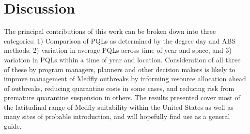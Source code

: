 \documentclass[10pt,a4paper,twocolumn]{article}
\begin{document}




\section*{Discussion}

The principal contributions of this work can be broken down into three categories: 
1) Comparison of PQLs as determined by the degree day and ABS methods. 
2) variation in average PQLs across time of year and space, and
3) variation in PQLs within a time of year and location.
Consideration of all three of these by program managers, planners and other decision makers 
is likely to
improve management of Medfly outbreaks %
by informing resource allocation ahead of outbreaks, reducing 
quarantine costs in some cases, and reducing risk from premature quarantine suspension in others. 
The results presented cover most of the latitudinal range 
of Medfly suitability within the United States 
as well as many sites of probable introduction,
and will hopefully find use as a general guide.
\end{document}
